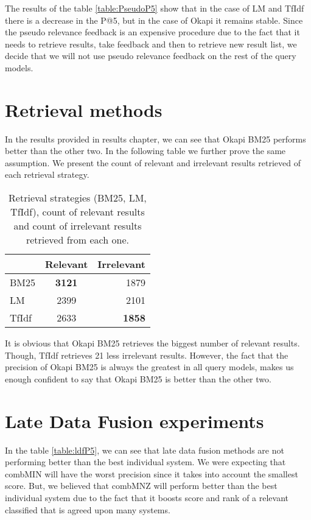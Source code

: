 The results of the table \ref{table:PseudoP5} show that in the case of LM and TfIdf there is a decrease in the P@5, but in the case of Okapi it remains stable. Since the pseudo relevance feedback is an expensive procedure due to the fact that it needs to retrieve results, take feedback and then to retrieve new result list, we decide that we will not use pseudo relevance feedback on the rest of the query models.



\section{Retrieval methods}

In the results provided in results chapter, we can see that Okapi BM25 performs better than the other two. In the following table we further prove the same assumption. We present the count of relevant and irrelevant results retrieved of each retrieval strategy.

\begin{table}[h]
\begin{center}
\caption{Retrieval strategies (BM25, LM, TfIdf), count of relevant results and count of irrelevant results retrieved from each one.}

\begin{tabular}{lcr}
\midrule
 & Relevant & Irrelevant  \\
\midrule
	BM25 & \textbf{3121} & 1879 \\
	LM & 2399 & 2101 \\
	TfIdf & 2633 & \textbf{1858} \\
\bottomrule
\end{tabular}
\end{center}
\end{table}

It is obvious that Okapi BM25 retrieves the biggest number of relevant results. Though, TfIdf retrieves 21 less irrelevant results. However, the fact that the precision of Okapi BM25 is always the greatest in all query models, makes us enough confident to say that Okapi BM25 is better than the other two.

\section{Late Data Fusion experiments}

In the table \ref{table:ldfP5}, we can see that late data fusion methods are not performing better than the best individual system. We were expecting that combMIN will have the worst precision since it takes into account the smallest score. But, we believed that combMNZ will perform better than the best individual system due to the fact that it boosts score and rank of a relevant classified that is agreed upon many systems.

